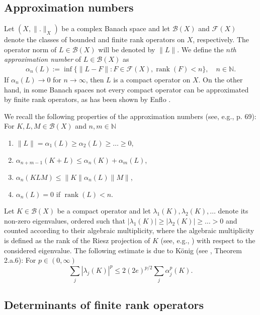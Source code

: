 \documentclass[12pt,a4paper]{article}
\theoremstyle{definition}
\theoremstyle{remark}
\numberwithin{equation}{section}
\newcommand{\mn}{{\mathbb N}}
\newcommand{\bdd}{\mathcal{B}}
\newcommand{\rank}{\operatorname{rank}}
\begin{document}
\subsection{Approximation numbers}

Let $(X,\|.\|_X)$ be a complex Banach space and let $\bdd(X)$ and $\mathcal{F}(X)$ denote the classes of bounded and finite rank operators on $X$, respectively. The operator norm of $L \in \bdd(X)$ will be denoted by $\|L\|$. We define the \emph{$n$th approximation number} of $L \in \bdd(X)$ as
\begin{align*} 
\alpha_n(L):=\inf\{\|L-F\|: F \in \mathcal{F}(X), \rank(F)< n\}, \quad n \in \mn.
\end{align*}
If $\alpha_n(L) \to 0$ for $n \to \infty$, then $L$ is a compact operator on $X$. On the other hand, in some Banach spaces not every compact operator can be approximated by finite rank operators, as has been shown by Enflo \cite{perenflo}.  
 
We recall the following properties of the approximation numbers (see, e.g., \cite{koenig} p. 69): For $K,L,M \in \bdd(X)$ and $n,m \in \mn$
\begin{enumerate}
\item[(i)] $\|L\|=\alpha_1(L)\geq \alpha_2(L) \geq \dots \geq 0$, 
\item[(ii)] $\alpha_{n+m-1}(K+L)\leq \alpha_n(K)+\alpha_m(L)$, 
\item[(iii)] $\alpha_{n}(KLM)\leq \|K\|\alpha_n(L)\|M\|$,
\item[(iv)] $\alpha_n(L)=0$ if $\rank(L) < n$. 
\end{enumerate}

Let $K \in \bdd(X)$ be a compact operator and let $\lambda_1(K),\lambda_2(K), \ldots$ denote its non-zero eigenvalues, ordered such that $|\lambda_1(K)| \geq |\lambda_2(K)| \geq \ldots>0$ and counted according to their algebraic multiplicity, where the algebraic multiplicity is defined as the rank of the Riesz projection of $K$ (see, e.g., \cite{gohberg1}) with respect to the considered eigenvalue.  The following estimate is due to K\"onig (see \cite{koenig}, Theorem 2.a.6): For $p \in (0,\infty)$ 
\begin{equation}
  \label{eq:7}
\sum_{j}|\lambda_j(K)|^p \leq 2(2e)^{p/2}\sum_{j}\alpha_j^p(K).  
\end{equation}

\subsection{Determinants of finite rank operators}
\end{document}
